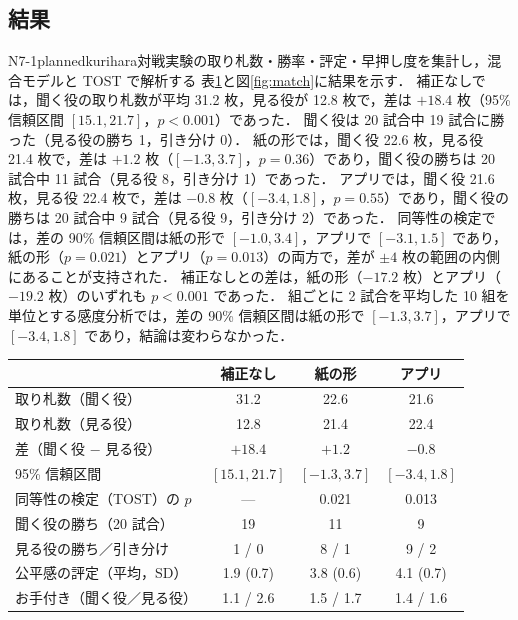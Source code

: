 \subsection{結果}

\begin{fd}{N7-1}{planned}{kurihara}{対戦実験の取り札数・勝率・評定・早押し度を集計し，混合モデルと TOST で解析する}
表\ref{tab:match}と図\ref{fig:match}に結果を示す．
補正なしでは，聞く役の取り札数が平均 31.2 枚，見る役が 12.8 枚で，差は $+18.4$ 枚（95\% 信頼区間 $[15.1, 21.7]$，$p < 0.001$）であった．
聞く役は 20 試合中 19 試合に勝った（見る役の勝ち 1，引き分け 0）．
紙の形では，聞く役 22.6 枚，見る役 21.4 枚で，差は $+1.2$ 枚（$[-1.3, 3.7]$，$p = 0.36$）であり，聞く役の勝ちは 20 試合中 11 試合（見る役 8，引き分け 1）であった．
アプリでは，聞く役 21.6 枚，見る役 22.4 枚で，差は $-0.8$ 枚（$[-3.4, 1.8]$，$p = 0.55$）であり，聞く役の勝ちは 20 試合中 9 試合（見る役 9，引き分け 2）であった．
同等性の検定では，差の 90\% 信頼区間は紙の形で $[-1.0, 3.4]$，アプリで $[-3.1, 1.5]$ であり，紙の形（$p = 0.021$）とアプリ（$p = 0.013$）の両方で，差が $\pm 4$ 枚の範囲の内側にあることが支持された．
補正なしとの差は，紙の形（$-17.2$ 枚）とアプリ（$-19.2$ 枚）のいずれも $p < 0.001$ であった．
組ごとに 2 試合を平均した 10 組を単位とする感度分析では，差の 90\% 信頼区間は紙の形で $[-1.3, 3.7]$，アプリで $[-3.4, 1.8]$ であり，結論は変わらなかった．
\end{fd}

\begin{table}[tb]
\label{tab:match}
\centering
\footnotesize
\setlength{\tabcolsep}{3pt}
\begin{tabular}{lccc}
\hline\hline
 & 補正なし & 紙の形 & アプリ \\
\hline
取り札数（聞く役） & 31.2 & 22.6 & 21.6 \\
取り札数（見る役） & 12.8 & 21.4 & 22.4 \\
差（聞く役 $-$ 見る役） & $+18.4$ & $+1.2$ & $-0.8$ \\
95\% 信頼区間 & $[15.1, 21.7]$ & $[-1.3, 3.7]$ & $[-3.4, 1.8]$ \\
同等性の検定（TOST）の $p$ & --- & 0.021 & 0.013 \\
聞く役の勝ち（20 試合） & 19 & 11 & 9 \\
見る役の勝ち／引き分け & 1 / 0 & 8 / 1 & 9 / 2 \\
公平感の評定（平均，SD） & 1.9 (0.7) & 3.8 (0.6) & 4.1 (0.7) \\
お手付き（聞く役／見る役） & 1.1 / 2.6 & 1.5 / 1.7 & 1.4 / 1.6 \\
\hline
\end{tabular}
\end{table}

